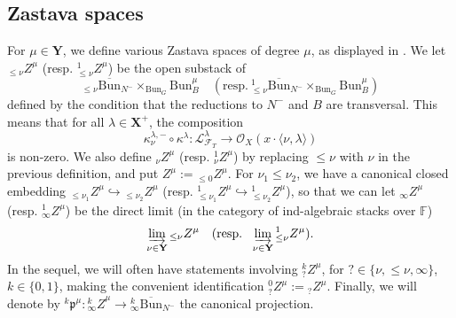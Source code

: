 \documentclass[11pt]{amsart}
\theoremstyle{plain}
\theoremstyle{remark}
\numberwithin{equation}{section}
\begin{document}
	
	\subsection{Zastava spaces}\label{section Zastava spaces}
	For $\mu\in\mathbf{Y}$, we define various Zastava spaces of degree $\mu$, as displayed in \cite[§4.1.4]{ABBGM}. We let $_{\leq\nu} Z^\mu$ (resp. $^1_{\leq\nu} Z^\mu$) be the open substack of
	$$_{\leq\nu} \overline{\mathrm{Bun}}_{N^-}\times_{\mathrm{Bun}_G}\mathrm{Bun}_B^\mu \quad(\text{resp.}~^1_{\leq\nu} \overline{\mathrm{Bun}}_{N^-}\times_{\mathrm{Bun}_G}\mathrm{Bun}_B^\mu)$$
	defined by the condition that the reductions to $N^-$ and $B$ are transversal. This means that for all $\lambda\in\mathbf{X}^+$, the composition $$\kappa^{\lambda,-}_\nu\circ\kappa^\lambda:\mathcal{L}^\lambda_{\mathcal{F}_T}\to \mathcal{O}_X(x\cdot\langle\nu,\lambda\rangle)$$ is non-zero. We also define $_{\nu} Z^\mu$ (resp. $^1_{\nu} Z^\mu$) by replacing $\leq\nu$ with $\nu$ in the previous definition, and put $ Z^\mu:={_{\leq0} Z^\mu}$. For $\nu_1\leq\nu_2$, we have a canonical closed embedding $_{\leq\nu_1} Z^\mu\hookrightarrow{_{\leq\nu_2} Z^\mu}$ (resp. $_{\leq\nu_1}^1 Z^\mu\hookrightarrow{_{\leq\nu_2}^1 Z^\mu}$), so that we can let $_{\infty} Z^\mu$ (resp. $_{\infty}^1 Z^\mu$) be the direct limit (in the category of ind-algebraic stacks over $\mathbb{F}$) 
	$$\varinjlim_{\nu\in \mathbf{Y}}{_{\leq\nu} Z^\mu}\quad (\text{resp}.~~\varinjlim_{\nu\in \mathbf{Y}}{_{\leq\nu}^1 Z^\mu}).$$ 
	In the sequel, we will often have statements involving $_{?}^k Z^\mu$, for $?\in\{\nu,\leq\nu,\infty\}$, $k\in\{0,1\}$, making the convenient identification $_{?}^0 Z^\mu:={_{?} Z^\mu}$.  Finally, we will denote by $^k\mathfrak{p}^\mu:{_\infty ^kZ}^\mu\to {_\infty^k\overline{\mathrm{Bun}}_{N^-}}$ the canonical projection. 
	
\end{document}
